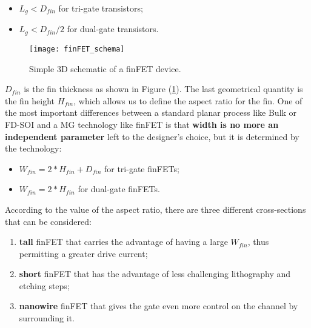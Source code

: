 \documentclass[a4paper, 12pt, twoside, openright]{report}
\begin{document}
\begin{itemize}
\item $L_{g} < D_{fin}$ for tri-gate transistors;
\item $L_{g} < D_{fin}/2$ for dual-gate transistors.
\end{itemize}

\begin{figure}[h]
\centering
\texttt{[image: finFET\_schema]}
\caption{Simple 3D schematic of a finFET device.}
\label{fig:finFET}
\end{figure} 

$D_{fin}$ is the fin thickness as shown in Figure (\ref{fig:finFET}). The last geometrical quantity is the fin height $H_{fin}$, which allows us to define the aspect ratio for the fin. One of the most important differences between a standard planar process like Bulk or FD-SOI and a MG technology like finFET is that \textbf{width is no more an independent parameter} left to the designer's choice, but it is determined by the technology:

\begin{itemize}
\item $W_{fin}=2*H_{fin}+D_{fin}$ for tri-gate finFETs;
\item $W_{fin}=2*H_{fin}$ for dual-gate finFETs.
\end{itemize}


According to the value of the aspect ratio, there are three different cross-sections that can be considered:

\begin{enumerate}
\item \textbf{tall} finFET that carries the advantage of having a large $W_{fin}$, thus permitting a greater drive current;
\item \textbf{short} finFET that has the advantage of less challenging lithography and etching steps;
\item \textbf{nanowire} finFET that gives the gate even more control on the channel by surrounding it.
\end{enumerate}
\end{document}

